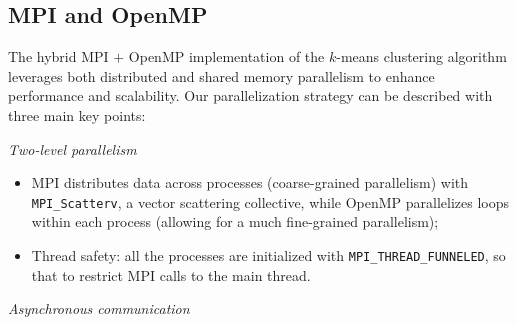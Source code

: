 \documentclass[11pt, journal]{IEEEtran}
\newcommand{\nwl}{

\vspace{11pt}

}
\begin{document}
\subsection{MPI and OpenMP}

The hybrid MPI $+$ OpenMP implementation of the $k$-means clustering algorithm leverages both distributed and shared memory parallelism to enhance performance and scalability. Our parallelization strategy can be described with three main key points:
\nwl
\noindent \textit{Two-level parallelism}
\begin{itemize}
    \item MPI distributes data across processes (coarse-grained parallelism) with \texttt{MPI\_Scatterv}, a vector scattering collective, while OpenMP parallelizes loops within each process (allowing for a much fine-grained parallelism);
    \item Thread safety: all the processes are initialized with \texttt{MPI\_THREAD\_FUNNELED}, so that to restrict MPI calls to the main thread.
\end{itemize}
\nwl
\noindent \textit{Asynchronous communication}
\end{document}
